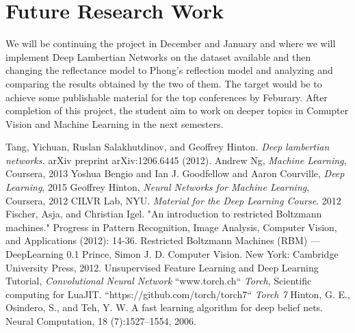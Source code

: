 \documentclass{article}
\begin{document}
\section{Future Research Work}
We will be continuing the project in December and January and where we will implement Deep Lambertian Networks on the dataset available and then changing the reflectance model to Phong's reflection model and analyzing and comparing the results obtained by the two of them. The target would be to achieve some publishable material for the top conferences by Feburary. After completion of this project, the student aim to work on deeper topics in Comupter Vision and Machine Learning in the next semesters.

\begin{thebibliography}{99}
 Tang, Yichuan, Ruslan Salakhutdinov, and Geoffrey Hinton. \textit{Deep lambertian networks.} arXiv preprint arXiv:1206.6445 (2012).
Andrew Ng, \textit{Machine Learning}, Coursera, 2013
 Yoshua Bengio and Ian J. Goodfellow and Aaron Courville,\textit{ Deep Learning}, 2015
 Geoffrey Hinton, \textit{Neural Networks for Machine Learning}, Coursera, 2012
 CILVR Lab, NYU.\textit{ Material for the Deep Learning Course}. 2012
 Fischer, Asja, and Christian Igel. "An introduction to restricted Boltzmann machines." Progress in Pattern Recognition, Image Analysis, Computer Vision, and Applications (2012): 14-36.
 Restricted Boltzmann Machines (RBM) — DeepLearning 0.1
 Prince, Simon J. D. Computer Vision. New York: Cambridge University Press, 2012.
 Unsupervised Feature Learning and Deep Learning Tutorial, \textit{Convolutional Neural Network}
 ``www.torch.ch`` \textit{Torch}, Scientific computing for LuaJIT.
 ``https://github.com/torch/torch7`` \textit{Torch 7}
 Hinton, G. E., Osindero, S., and Teh, Y. W. A fast learning algorithm for deep belief nets. Neural Computation, 18 (7):1527–1554, 2006.
\end{thebibliography}
\end{document}
